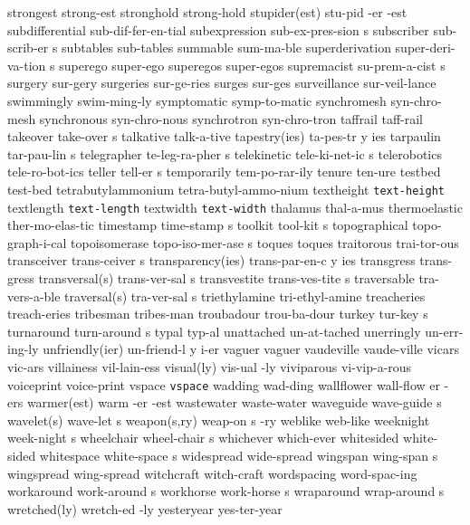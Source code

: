 \1 strongest		strong-est
\1 stronghold		strong-hold
\3 stupider(est)	stu-pid -er -est
\1 subdifferential	sub-dif-fer-en-tial	%
\5 subexpression	sub-ex-pres-sion s	%
\5 subscriber 		sub-scrib-er s
\NewWordtrue
\1 subtables		sub-tables		%
\1 summable		sum-ma-ble
\NewWordtrue
\5 superderivation	super-deri-va-tion s	%
\1 superego		super-ego
\1 superegos		super-egos
\5 supremacist		su-prem-a-cist s
\NewWordtrue
\1 surgery		sur-gery		%
\NewWordtrue
\1 surgeries		sur-ge-ries		%
\NewWordtrue
\1 surges		sur-ges 		%
\1 surveillance		sur-veil-lance
\1 swimmingly		swim-ming-ly
\1 symptomatic		symp-to-matic
\1 synchromesh		syn-chro-mesh
\1 synchronous		syn-chro-nous
\1 synchrotron		syn-chro-tron
\1 taffrail		taff-rail		%
\NewWordtrue
\5 takeover		take-over s		%
\1 talkative		talk-a-tive
\3 tapestry(ies)	ta-pes-tr y ies
\5 tarpaulin		tar-pau-lin s
\5 telegrapher		te-leg-ra-pher s
\5 telekinetic		tele-ki-net-ic s
\1 telerobotics		tele-ro-bot-ics
\5 teller		tell-er s		%
\1 temporarily		tem-po-rar-ily		%
\1 tenure		ten-ure
\1 testbed		test-bed
\1 tetrabutylammonium	tetra-butyl-ammo-nium	%
\1 textheight		{\tt\bs text-height}	%
\1 textlength		{\tt\bs text-length}	%
\1 textwidth		{\tt\bs text-width}
\1 thalamus		thal-a-mus
\1 thermoelastic	ther-mo-elas-tic
\5 timestamp		time-stamp s
\5 toolkit		tool-kit s
\1 topographical	topo-graph-i-cal
\NewWordtrue
\5 topoisomerase	topo-iso-mer-ase s	%
\1 toques		toques
\1 traitorous		trai-tor-ous
\5 transceiver		trans-ceiver s
\3 transparency(ies)	trans-par-en-c y ies	%
\1 transgress		trans-gress
\2 transversal(s)	trans-ver-sal s
\5 transvestite		trans-ves-tite s
\1 traversable		tra-vers-a-ble
\2 traversal(s)		tra-ver-sal s
\1 triethylamine	tri-ethyl-amine		%
\1 treacheries		treach-eries
\1 tribesman		tribes-man		%
\1 troubadour		trou-ba-dour
\5 turkey		tur-key s
\5 turnaround		turn-around s
\1 typal		typ-al
\1 unattached		un-at-tached
\1 unerringly		un-err-ing-ly
\3 unfriendly(ier)	un-friend-l y i-er
\1 vaguer		vaguer
\1 vaudeville		vaude-ville
\1 vicars		vic-ars
\1 villainess		vil-lain-ess
\2 visual(ly)		vis-ual -ly		%
\1 viviparous		vi-vip-a-rous
\1 voiceprint		voice-print
\1 vspace 		{\tt\bs vspace}
\1 wadding		wad-ding
\6 wallflower		wall-flow er -ers
\3 warmer(est)		warm -er -est		%
\1 wastewater		waste-water
\5 waveguide		wave-guide s
\2 wavelet(s)		wave-let s
\NewWordtrue
\3 weapon(s,ry)		weap-on s -ry		%
\1 weblike		web-like
\5 weeknight		week-night s
\5 wheelchair		wheel-chair s
\1 whichever		which-ever
\1 whitesided		white-sided
\5 whitespace		white-space s
\1 widespread		wide-spread
\5 wingspan		wing-span s	%
\1 wingspread		wing-spread
\1 witchcraft		witch-craft
\1 wordspacing		word-spac-ing
\5 workaround		work-around s		%
\5 workhorse		work-horse s
\5 wraparound		wrap-around s		%
\2 wretched(ly)		wretch-ed -ly
\1 yesteryear		yes-ter-year
\endgraf
\endgroup

